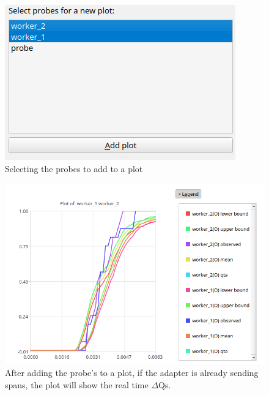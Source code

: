     \begin{figure}[H]
        \begin{center}
        \includegraphics[width = \textwidth]{img/manual/add_plot2.png}
        \end{center}
        \caption{Selecting the probes to add to a plot}
    \end{figure}

    \begin{figure}[H]
        \begin{center}
        \includegraphics[width = \textwidth]{img/manual/running.png}
        \end{center}
        \caption{After adding the probe's to a plot, if the adapter is already sending spans, the plot will show the real time $\Delta$Qs.}
    \end{figure}

